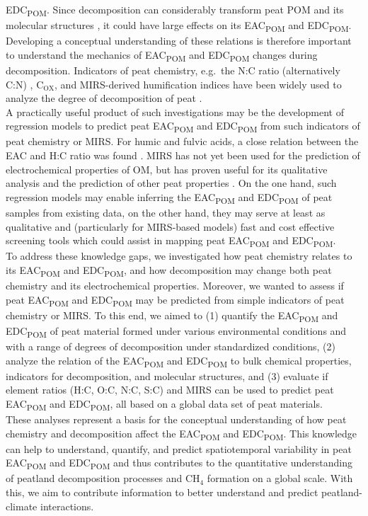 \documentclass[draft,linenumbers]{agujournal2018}
\begin{document}
EDC\textsubscript{POM}. Since decomposition can considerably transform
peat POM and its molecular structures \citep{Cocozza.2003}, it could
have large effects on its EAC\textsubscript{POM} and
EDC\textsubscript{POM}. Developing a conceptual understanding of these
relations is therefore important to understand the mechanics of
EAC\textsubscript{POM} and EDC\textsubscript{POM} changes during
decomposition. Indicators of peat chemistry, e.g.~the N:C ratio
(alternatively C:N) \citep{Biester.2014}, C\(_\text{OX}\), and
MIRS-derived humification indices \citep{Broder.2012} have been widely
used to analyze the degree of decomposition of peat
\citep{Biester.2014, Drollinger.2020}.\\
A practically useful product of such investigations may be the
development of regression models to predict peat EAC\textsubscript{POM}
and EDC\textsubscript{POM} from such indicators of peat chemistry or
MIRS. For humic and fulvic acids, a close relation between the EAC and
H:C ratio was found \citep{Aeschbacher.2010, Tan.2017}. MIRS has not yet
been used for the prediction of electrochemical properties of OM, but
has proven useful for its qualitative analysis
\citep{HernandezMontoya.2012, Yuan.2018} and the prediction of other
peat properties \citep{Hodgkins.2018, Artz.2008}. On the one hand, such
regression models may enable inferring the EAC\textsubscript{POM} and
EDC\textsubscript{POM} of peat samples from existing data, on the other
hand, they may serve at least as qualitative and (particularly for
MIRS-based models) fast and cost effective screening tools which could
assist in mapping peat EAC\textsubscript{POM} and
EDC\textsubscript{POM}.\\
To address these knowledge gaps, we investigated how peat chemistry
relates to its EAC\textsubscript{POM} and EDC\textsubscript{POM}, and
how decomposition may change both peat chemistry and its electrochemical
properties. Moreover, we wanted to assess if peat EAC\textsubscript{POM}
and EDC\textsubscript{POM} may be predicted from simple indicators of
peat chemistry or MIRS. To this end, we aimed to (1) quantify the
EAC\textsubscript{POM} and EDC\textsubscript{POM} of peat material
formed under various environmental conditions and with a range of
degrees of decomposition under standardized conditions, (2) analyze the
relation of the EAC\textsubscript{POM} and EDC\textsubscript{POM} to
bulk chemical properties, indicators for decomposition, and molecular
structures, and (3) evaluate if element ratios (H:C, O:C, N:C, S:C) and
MIRS can be used to predict peat EAC\textsubscript{POM} and
EDC\textsubscript{POM}, all based on a global data set of peat
materials.\\
These analyses represent a basis for the conceptual understanding of how
peat chemistry and decomposition affect the EAC\textsubscript{POM} and
EDC\textsubscript{POM}. This knowledge can help to understand, quantify,
and predict spatiotemporal variability in peat EAC\textsubscript{POM}
and EDC\textsubscript{POM} and thus contributes to the quantitative
understanding of peatland decomposition processes and CH\(_4\) formation
on a global scale. With this, we aim to contribute information to better
understand and predict peatland-climate interactions.
\end{document}
